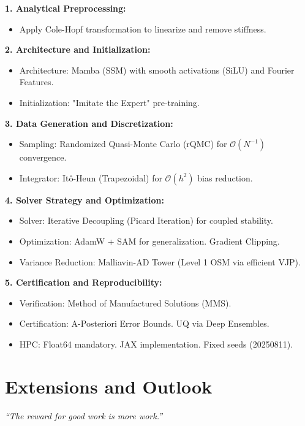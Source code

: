 \begin{tcolorbox}[colback=gray!5!white, colframe=gray!50!black, title={Unified State-of-the-Art Pipeline (2025)}]
\textbf{1. Analytical Preprocessing:}
\begin{itemize}
    \item Apply Cole-Hopf transformation to linearize and remove stiffness.
\end{itemize}
\textbf{2. Architecture and Initialization:}
\begin{itemize}
    \item Architecture: Mamba (SSM) with smooth activations (SiLU) and Fourier Features.
    \item Initialization: "Imitate the Expert" pre-training.
\end{itemize}
\textbf{3. Data Generation and Discretization:}
\begin{itemize}
    \item Sampling: Randomized Quasi-Monte Carlo (rQMC) for $\mathcal{O}(N^{-1})$ convergence.
    \item Integrator: Itô-Heun (Trapezoidal) for $\mathcal{O}(h^2)$ bias reduction.
\end{itemize}
\textbf{4. Solver Strategy and Optimization:}
\begin{itemize}
    \item Solver: Iterative Decoupling (Picard Iteration) for coupled stability.
    \item Optimization: AdamW + SAM for generalization. Gradient Clipping.
    \item Variance Reduction: Malliavin-AD Tower (Level 1 OSM via efficient VJP).
\end{itemize}
\textbf{5. Certification and Reproducibility:}
\begin{itemize}
    \item Verification: Method of Manufactured Solutions (MMS).
    \item Certification: A-Posteriori Error Bounds. UQ via Deep Ensembles.
    \item HPC: Float64 mandatory. JAX implementation. Fixed seeds (20250811).
\end{itemize}
\end{tcolorbox}

\clearpage
\part{Extensions and Outlook}
\label{part:extensions}

\begin{center}
\textit{“The reward for good work is more work.”}
\end{center}

